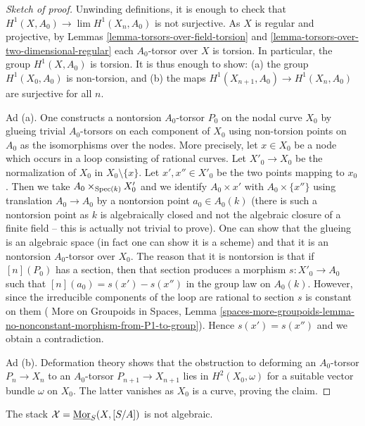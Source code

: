 \begin{proof}[Sketch of proof]
Unwinding definitions, it is enough to check that
$H^1(X, A_0) \to \lim H^1(X_n, A_0)$ is not surjective.
As $X$ is regular and projective, by
Lemmas \ref{lemma-torsors-over-field-torsion} and
\ref{lemma-torsors-over-two-dimensional-regular}
each $A_0$-torsor over $X$ is torsion.
In particular, the group $H^1(X, A_0)$ is torsion.
It is thus enough to show:
(a) the group $H^1(X_0, A_0)$ is non-torsion, and
(b) the maps $H^1(X_{n + 1}, A_0) \to H^1(X_n, A_0)$ are surjective for all $n$.

\medskip\noindent
Ad (a). One constructs a nontorsion $A_0$-torsor $P_0$ on the nodal
curve $X_0$ by glueing trivial $A_0$-torsors on each component
of $X_0$ using non-torsion points on $A_0$ as the isomorphisms
over the nodes. More precisely, let $x \in X_0$ be a node
which occurs in a loop consisting of rational curves.
Let $X'_0 \to X_0$ be the normalization of $X_0$ in $X_0 \setminus \{x\}$.
Let $x', x'' \in X'_0$ be the two points mapping to $x_0$.
Then we take $A_0 \times_{\mathop{\mathrm{Spec}}(k)} X'_0$ and we identify
$A_0 \times {x'}$ with $A_0 \times \{x''\}$ using translation
$A_0 \to A_0$ by a nontorsion point $a_0 \in A_0(k)$ (there is such
a nontorsion point as $k$ is algebraically closed and not the algebraic
closure of a finite field -- this is actually not trivial to prove).
One can show that the glueing is an algebraic space (in fact one can
show it is a scheme) and that it is an nontorsion $A_0$-torsor over $X_0$.
The reason that it is nontorsion is that if $[n](P_0)$ has a section,
then that section produces a morphism $s : X'_0 \to A_0$ such that
$[n](a_0) = s(x') - s(x'')$ in the group law on $A_0(k)$. However,
since the irreducible components of the loop are rational to
section $s$ is constant on them (
More on Groupoids in Spaces, Lemma
\ref{spaces-more-groupoids-lemma-no-nonconstant-morphism-from-P1-to-group}).
Hence $s(x') = s(x'')$ and we obtain a contradiction.

\medskip\noindent
Ad (b). Deformation theory shows that the obstruction to deforming an
$A_0$-torsor $P_n \to X_n$ to an $A_0$-torsor $P_{n + 1} \to X_{n + 1}$
lies in $H^2(X_0, \omega)$ for a suitable vector bundle $\omega$ on $X_0$.
The latter vanishes as $X_0$ is a curve, proving the claim.
\end{proof}

\begin{proposition}
\label{proposition-nonalghomstack}
The stack $\mathcal{X} = \underline{\mathop{\mathrm{Mor}}\nolimits}_S(X, [S/A])$ is not algebraic.
\end{proposition}

